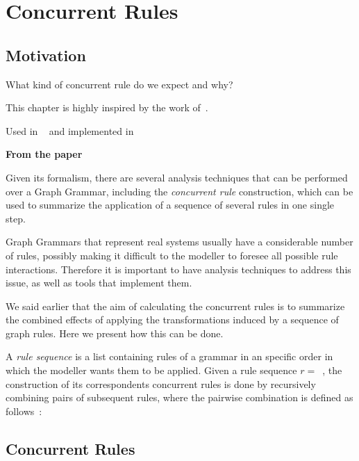 \chapter{Concurrent Rules}\label{ch:concurrent-rules}

\section{Motivation}

What kind of concurrent rule do we expect and why?

This chapter is highly inspired by the work of~\cite{Lambers2010}. 

Used in ~\cite{BezerraWEIT2016} and implemented in ~\cite{BezerraETMF2016}

\textbf{From the paper}

Given its formalism, there are several analysis techniques that can be performed over a Graph Grammar, including the \emph{concurrent rule} construction, which can be used to summarize the application of a sequence of several rules in one single step.

Graph Grammars that represent real systems usually have a considerable number of rules, possibly making it difficult to the modeller to foresee all possible rule interactions. Therefore it is important to have analysis techniques to address this issue, as well as tools that implement them.

We said earlier that the aim of calculating the concurrent rules is to summarize the combined effects of applying the transformations induced by a sequence of graph rules. Here we present how this can be done.

A \emph{rule sequence} is a list containing rules of a grammar in an specific order in which the modeller wants them to be applied. Given a rule sequence \mbox{$r =$ }, the construction of its correspondents concurrent rules is done by recursively combining pairs of subsequent rules, where the pairwise combination is defined as follows~\cite{Ehrig2006,Lambers2010}:  

\section{Concurrent Rules}

\begin{definition}

\end{definition}

